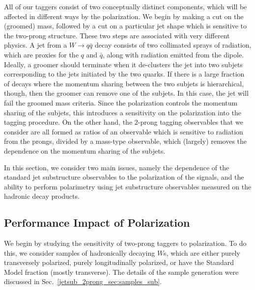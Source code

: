 \documentclass[11pt,letterpaper]{article}
\begin{document}
All of our taggers consist of two conceptually distinct components, which will be affected in different ways by the polarization.
%
We begin by making a cut on the (groomed) mass, followed by a cut on a particular jet shape which is sensitive to the two-prong structure. These two steps are associated with very different physics. A jet from a $W\to q\bar q$ decay consists of two collimated sprays of radiation, which are proxies for the $q$ and $\bar q$, along with radiation emitted from the dipole.
%
Ideally, a groomer should terminate when it de-clusters the jet into two subjets corresponding to the jets initiated by the two quarks.
%
If there is a large fraction of decays where the momentum sharing between the two subjets is hierarchical, though, then the groomer can remove one of the subjets.
%
In this case, the jet will fail the groomed mass criteria.
%
Since the polarization controls the momentum sharing of the subjets, this introduces a sensitivity on the polarization into the tagging procedure.
%
On the other hand, the $2$-prong tagging observables that we consider are all formed as ratios of an observable which is sensitive to radiation from the prongs, divided by a mass-type observable, which (largely) removes the dependence on the momentum sharing of the subjets.

In this section, we consider two main issues, namely
the dependence of the standard jet substructure observables to the
polarization of the signals, and the ability to perform polarimetry
using jet substructure observables measured on the hadronic decay
products.

\subsection{Performance Impact of Polarization}\label{jetsub_2prong_sec:polar_robust}


We begin by studying the sensitivity of two-prong taggers to polarization.
%
To do this, we consider samples of hadronically decaying $W$s, which are either purely transversely polarized, purely longitudinally polarized, or have the Standard Model fraction (mostly transverse).
%
The details of the sample generation were discussed in Sec.~\ref{jetsub_2prong_sec:samples_sub}.
\end{document}
